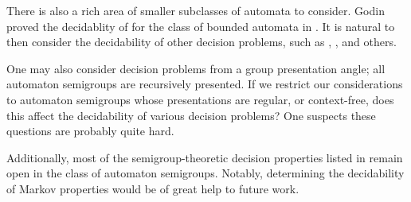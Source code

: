\documentclass[11pt, titlepage]{article}
\begin{document}
There is also a rich area of smaller subclasses of automata to
consider. Godin proved the decidablity of  for the
class of bounded automata in \cite{Godin:knapsack}. It is natural to
then consider the decidability of other decision problems, such as
, , and others.

One may also consider decision problems from a group presentation
angle; all automaton semigroups are recursively presented. If we
restrict our considerations to automaton semigroups whose
presentations are regular, or context-free, does this affect the
decidability of various decision problems? One suspects these
questions are probably quite hard.

Additionally, most of the semigroup-theoretic decision properties
listed in \cite{Cain09:dec_prob} remain open in the class of automaton
semigroups. Notably, determining the decidability of Markov properties
would be of great help to future work.


\nocite{*}

\end{document}
